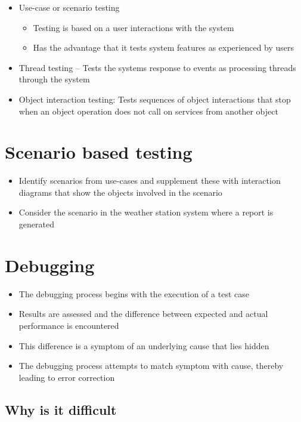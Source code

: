 \documentclass{article}
\begin{document}
\begin{itemize}
  \item Use-case or scenario testing
  \begin{itemize}
    \item Testing is based on a user interactions with the system
    \item Has the advantage that it tests system features as experienced by users 
  \end{itemize}
  \item Thread testing – Tests the systems response to events as processing threads through the system 
  \item Object interaction testing: Tests sequences of object interactions that stop when an object operation does not call on services from another object
\end{itemize}

\section{Scenario based testing}

\begin{itemize}
  \item Identify scenarios from use-cases and supplement these with interaction diagrams that show the objects involved in the scenario
  \item Consider the scenario in the weather station system where a report is generated
\end{itemize}

\section{Debugging}

\begin{itemize}
  \item The debugging process begins with the execution of a test case 
  \item Results are assessed and the difference between expected and actual performance is encountered 
  \item This difference is a symptom of an underlying cause that lies hidden
  \item The debugging process attempts to match symptom with cause, thereby leading to error correction
\end{itemize}

\subsection{Why is it difficult}
\end{document}
